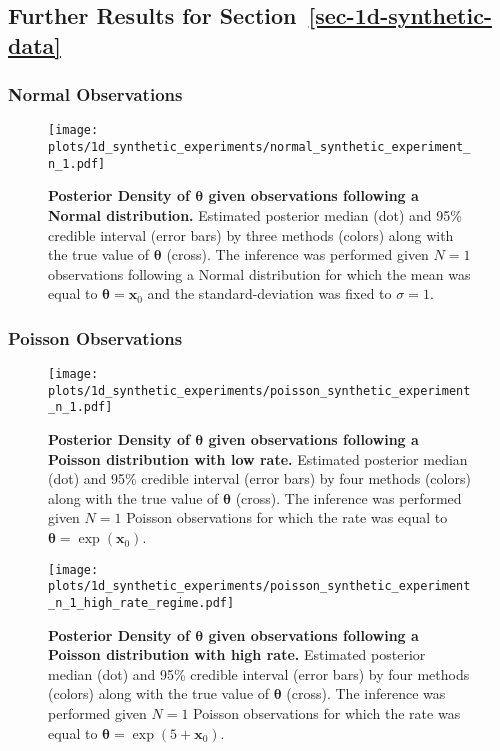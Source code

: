 \subsection{Further Results for Section~\ref{sec-1d-synthetic-data}}
\label{app-results-synthetic-1d}
\subsubsection{Normal Observations}
\begin{figure*}[h!]
\centering
\texttt{[image: plots/1d\_synthetic\_experiments/normal\_synthetic\_experiment\_n\_1.pdf]}
\caption{\textbf{Posterior Density of $\boldsymbol{\theta}$ given observations following a Normal distribution.} Estimated posterior median (dot) and 95\% credible interval (error bars) by three methods (colors) along with the true value of $\boldsymbol{\theta}$ (cross). The inference was performed given $N=1$ observations following a Normal distribution for which the mean was equal to $\boldsymbol{\theta} = \mathbf{x}_0$ and the standard-deviation was fixed to $\sigma =1$.}
\label{fig:synthetic-data-experiment-gaussian}
\end{figure*}



\subsubsection{Poisson Observations}
\begin{figure*}[h!]
\centering
\texttt{[image: plots/1d\_synthetic\_experiments/poisson\_synthetic\_experiment\_n\_1.pdf]}
\caption{\textbf{Posterior Density of $\boldsymbol{\theta}$ given observations following a Poisson distribution with low rate.} Estimated posterior median (dot) and 95\% credible interval (error bars) by four methods (colors) along with the true value of $\boldsymbol{\theta}$ (cross). The inference was performed given $N=1$ Poisson observations for which the rate was equal to $\boldsymbol{\theta} = \exp (\mathbf{x}_0)$.}
\label{fig:synthetic-data-experiment-poisson-low-rate}
\end{figure*}

\begin{figure*}[h!]
\centering
\texttt{[image: plots/1d\_synthetic\_experiments/poisson\_synthetic\_experiment\_n\_1\_high\_rate\_regime.pdf]}
\caption{\textbf{Posterior Density of $\boldsymbol{\theta}$ given observations following a Poisson distribution with high rate.} Estimated posterior median (dot) and 95\% credible interval (error bars) by four methods (colors) along with the true value of $\boldsymbol{\theta}$ (cross). The inference was performed given $N=1$ Poisson observations for which the rate was equal to $\boldsymbol{\theta} = \exp (5 + \mathbf{x}_0)$.}
\label{fig:synthetic-data-experiment-poisson-high-rate}
\end{figure*}

